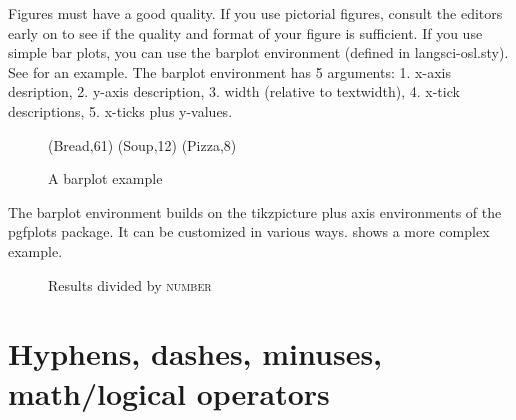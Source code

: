 Figures must have a good quality. If you use pictorial figures, consult the editors early on to see if the quality and format of your figure is sufficient. If you use simple bar plots, you can use the barplot environment (defined in langsci-osl.sty). See  for an example. The barplot environment has 5 arguments: 1. x-axis desription, 2. y-axis description, 3. width (relative to textwidth), 4. x-tick descriptions, 5. x-ticks plus y-values.

\begin{figure}
    \centering
    {
    (Bread,61)
    (Soup,12)
    (Pizza,8)
    }
    \caption{A barplot example}
    \label{sim:fig:barplot}
\end{figure}

The barplot environment builds on the tikzpicture plus axis environments of the pgfplots package. It can be customized in various ways.  shows a more complex example.

\begin{figure}
    \caption{Results divided by \textsc{number}}
    \label{sim:fig:complex-barplot}
\end{figure}

\section{Hyphens, dashes, minuses, math/logical operators}\label{sim:sec:hyphens-etc}

